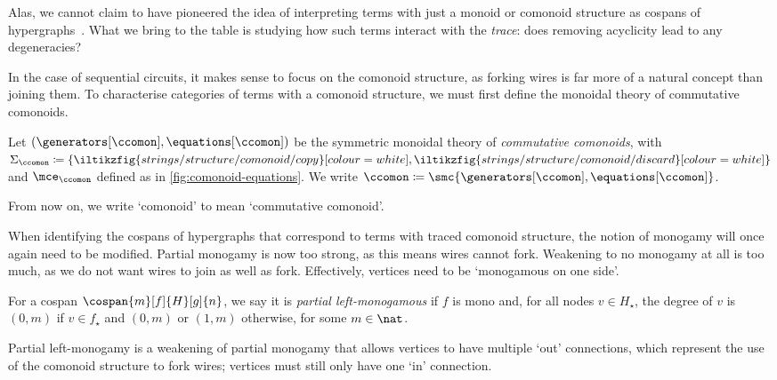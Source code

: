 \begin{remark}
    Alas, we cannot claim to have pioneered the idea of interpreting terms with
    just a monoid or comonoid structure as cospans of
    hypergraphs~\cite{fritz2023free,milosavljevic2023string}.
    What we bring to the table is studying how such terms interact with the
    \emph{trace}: does removing acyclicity lead to any degeneracies?
\end{remark}

In the case of sequential circuits, it makes sense to focus on the comonoid
structure, as forking wires is far more of a natural concept than joining them.
To characterise categories of terms with a comonoid structure, we must first
define the monoidal theory of commutative comonoids.

\begin{definition}
    Let \((\generators[\ccomon], \equations[\ccomon])\) be the symmetric
    monoidal theory of \emph{commutative comonoids}, with \(
    \Sigma_{\ccomon} \coloneqq \{
    \iltikzfig{strings/structure/comonoid/copy}[colour=white],
    \iltikzfig{strings/structure/comonoid/discard}[colour=white]
    \}
    \) and \(\mce_{\ccomon}\) defined as in \cref{fig:comonoid-equations}.
    We write \(
    \ccomon \coloneqq \smc{\generators[\ccomon], \equations[\ccomon]}
    \).
\end{definition}



From now on, we write `comonoid' to mean `commutative comonoid'.

When identifying the cospans of hypergraphs that correspond to terms with traced
comonoid structure, the notion of monogamy will once again need to be modified.
Partial monogamy is now too strong, as this means wires cannot fork.
Weakening to no monogamy at all is too much, as we do not want wires to join as
well as fork.
Effectively, vertices need to be `monogamous on one side'.

\begin{definition}
    For a cospan \(\cospan{m}[f]{H}[g]{n}\), we say it is
    \emph{partial left-monogamous} if \(f\) is mono and, for all nodes
    \(v \in H_\star\), the degree of \(v\) is \((0,m)\) if \(v \in f_\star\) and
    \((0,m)\) or \((1,m)\) otherwise, for some \(m \in \nat\).
\end{definition}

Partial left-monogamy is a weakening of partial monogamy that allows vertices
to have multiple `out' connections, which represent the use of the comonoid
structure to fork wires; vertices must still only have one `in' connection.

